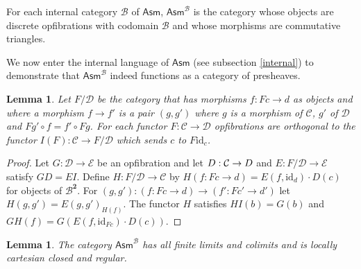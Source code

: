 \documentclass{amsart}
\theoremstyle{plain}
\newtheorem{lemma}[theorem]{Lemma}
\theoremstyle{definition}
\newcommand\cat\mathcal
\newcommand\id{\mathrm{id}}
\newcommand\Asm{\mathsf{Asm}}
\newcommand\sier{{\mathbf 2}}
\begin{document}
For each internal category $\cat B$ of $\Asm$, $\Asm^{\cat B}$ is the category whose objects are discrete opfibrations with codomain $\cat B$ and whose morphisms are commutative triangles. 

We now enter the internal language of $\Asm$ (see subsection \ref{internal}) to demonstrate that $\Asm^{\cat B}$ indeed functions as a category of presheaves.

\begin{lemma} Let $F/\cat D$ be the category that has morphisms $f:Fc\to d$ as objects and where a morphism $f\to f'$ is a pair $(g,g')$ where $g$ is a morphism of $\cat C$, $g'$ of $\cat D$ and $Fg'\circ f=f'\circ Fg$. For each functor $F:\cat C\to \cat D$ opfibrations are orthogonal to the functor $I(F):\cat C \to F/\cat D$ which sends $c$ to $F\id_c$. \label{Yoneda} \end{lemma}

\begin{proof} Let $G:\cat D\to\cat E$ be an opfibration and let $D:\cat C\to \cat \cat D$ and $E:F/\cat D \to \cat E$ satisfy $GD=EI$. Define $H:F/\cat D\to \cat C$ by $H(f:Fc\to d) = E(f,\id_{d})\cdot D(c)$ for objects of $\cat B^\sier$. For $(g,g'):(f:Fc\to d) \to (f':Fc'\to d')$ let $H(g,g') = E(g,g')_{H(f)}$. The functor $H$ satisfies $HI(b) = G(b)$ and $GH(f) = G(E(f,\id_{Fc})\cdot D(c))$.
\end{proof}

\begin{lemma} The category $\Asm^{\cat B}$ has all finite limits and colimits and is locally cartesian closed and regular. \end{lemma}
\end{document}
